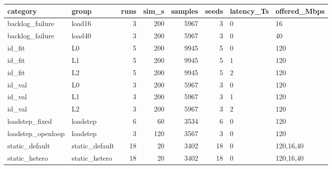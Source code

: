\begin{tabular}{llrrrrll}
\toprule
category & group & runs & sim_s & samples & seeds & latency_Ts & offered_Mbps \\
\midrule
backlog_failure & load16 & 3 & 200 & 5967 & 3 & 0 & 16 \\
backlog_failure & load40 & 3 & 200 & 5967 & 3 & 0 & 40 \\
id_fit & L0 & 5 & 200 & 9945 & 5 & 0 & 120 \\
id_fit & L1 & 5 & 200 & 9945 & 5 & 1 & 120 \\
id_fit & L2 & 5 & 200 & 9945 & 5 & 2 & 120 \\
id_val & L0 & 3 & 200 & 5967 & 3 & 0 & 120 \\
id_val & L1 & 3 & 200 & 5967 & 3 & 1 & 120 \\
id_val & L2 & 3 & 200 & 5967 & 3 & 2 & 120 \\
loadstep_fixed & loadstep & 6 & 60 & 3534 & 6 & 0 & 120 \\
loadstep_openloop & loadstep & 3 & 120 & 3567 & 3 & 0 & 120 \\
static_default & static_default & 18 & 20 & 3402 & 18 & 0 & 120,16,40 \\
static_hetero & static_hetero & 18 & 20 & 3402 & 18 & 0 & 120,16,40 \\
\bottomrule
\end{tabular}
